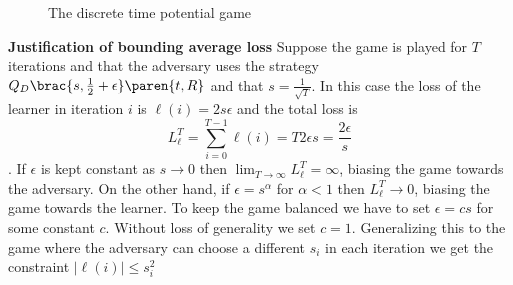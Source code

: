 \documentclass{article}[12pt]
\begin{document}
\begin{figure}[ht!]
\caption{The discrete time potential game  \label{fig:discrete-Time-Game}}
\end{figure}


{\bf Justification of bounding average loss} Suppose the game is
played for $T$ iterations and that the adversary uses the strategy
$\adversMd\brac{s,\frac{1}{2}+\epsilon}\paren{t,\R}$ and that
$s=\frac{1}{\sqrt{T}}$. In this case the loss of the learner in
iteration $i$ is $\ell(i)=2s\epsilon$ and the total loss is
$$L_\ell^T=\sum_{i=0}^{T-1} \ell(i) = T 2 \epsilon s = \frac{2 \epsilon}{s}$$.
If $\epsilon$ is kept constant as $s \to 0$ then
$\lim_{T \to \infty}L_\ell^T=\infty$, biasing the game towards the
adversary. On the other hand, if $\epsilon =s^{\alpha}$ for $\alpha<1$
then $L_\ell^T \to 0$, biasing the game towards the learner. To keep
the game balanced we have to set $\epsilon=cs$ for some constant
$c$. Without loss of generality we set $c=1$.
Generalizing this to the game where the adversary can choose a
different $s_i$ in each iteration we get the constraint
$|\ell(i)| \leq s_i^2$
\end{document}
